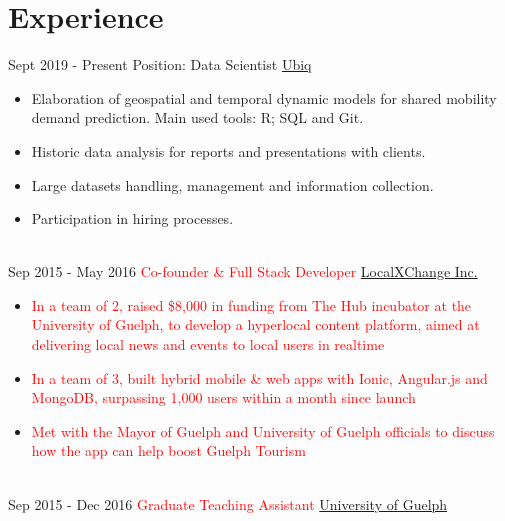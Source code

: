 \documentclass[letterpaper]{twentysecondcv} %
\begin{document}
\makeprofile %
 

\section{Experience}

\begin{twenty} %
\twentyitem
    	{Sept 2019 -}
		{Present}
        {Position: Data Scientist}
        {\href{http://www.ubiq.ai/}{Ubiq}}
        {}
        {\begin{itemize}
        \item Elaboration of geospatial and temporal dynamic models for shared mobility demand prediction. Main used tools: R; SQL and Git.
        \item Historic data analysis for reports and presentations with clients.
        \item Large datasets handling, management and information collection. 
        \item Participation in hiring processes. 
        \end{itemize}}
        \\
	\twentyitem
    	{Sep 2015 -}
		{May 2016}
        {\textcolor{red}{Co-founder \& Full Stack Developer}}
        {\href{http://www.localxchange.ca/}{LocalXChange Inc.}}
        {}
        {
        {\begin{itemize}
        \item \textcolor{red}{In a team of 2, raised \$8,000 in funding from The Hub incubator at the University of Guelph, to develop a hyperlocal content platform, aimed at delivering local news and events to local users in realtime}
        \item \textcolor{red}{In a team of 3, built hybrid mobile \& web apps with Ionic, Angular.js and MongoDB, surpassing 1,000 users within a month since launch}
        \item \textcolor{red}{Met with the Mayor of Guelph and University of Guelph officials to discuss how the app can help boost Guelph Tourism} 
    \end{itemize}}
        }
    \\   
    \twentyitem
   		{Sep 2015 -}
		{Dec 2016}
        {\textcolor{red}{Graduate Teaching Assistant}}
        {\href{http://www.uoguelph.ca}{University of Guelph}}

\end{twenty}
\end{document}
